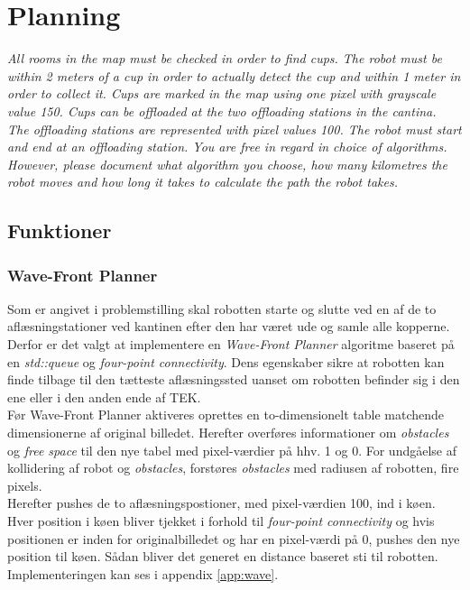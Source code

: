 \section{Planning}
\label{sec:plan}
\textit{All rooms in the map must be checked in order to find cups. The robot must be within 2 meters of a cup in order to actually detect the cup and within 1 meter in order to collect it. Cups are marked in the map using one pixel with grayscale value 150. Cups can be offloaded at the two offloading stations in the cantina. The offloading stations are represented with pixel values 100. The robot must start and end at an offloading station.
You are free in regard in choice of algorithms. However, please document what algorithm you choose, how many kilometres the robot moves and how long it takes to calculate the path the robot takes.}

\subsection{Funktioner}

\subsubsection{Wave-Front Planner}
Som er angivet i problemstilling skal robotten starte og slutte ved en af de to aflæsningstationer ved kantinen efter den har været ude og samle alle kopperne. Derfor er det valgt at implementere en \emph{Wave-Front Planner} algoritme baseret på en \emph{std::queue} og \emph{four-point connectivity}. 
Dens egenskaber sikre at robotten kan finde tilbage til den tætteste aflæsningssted uanset om robotten befinder sig i den ene eller i den anden ende af TEK. \\

Før Wave-Front Planner aktiveres oprettes en to-dimensionelt table matchende dimensionerne af original billedet. Herefter overføres informationer om \emph{obstacles} og \emph{free space} til den nye tabel med pixel-værdier på hhv. 1 og 0. For undgåelse af kollidering af robot og \emph{obstacles}, forstøres \emph{obstacles} med radiusen af robotten, fire pixels.\\
Herefter pushes de to aflæsningspostioner, med pixel-værdien 100, ind i køen. \\

Hver position i køen bliver tjekket i forhold til \emph{four-point connectivity} og hvis positionen er inden for originalbilledet og har en pixel-værdi på 0, pushes den nye position til køen. Sådan bliver det generet en distance baseret sti til robotten.\\

Implementeringen kan ses i appendix \ref{app:wave}.
